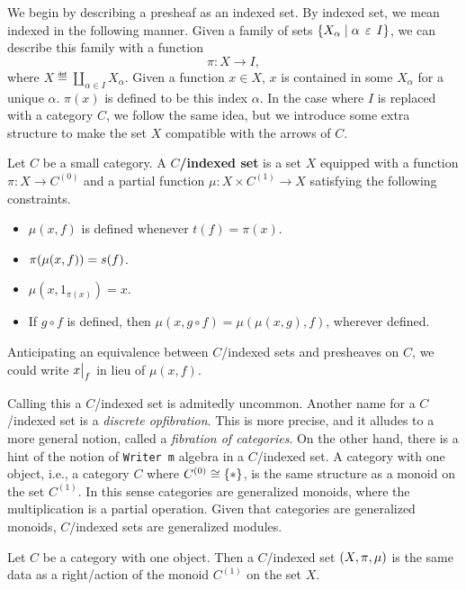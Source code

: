 \documentclass[../main.tex]{subfiles}
\begin{document}
We begin by describing a presheaf as an indexed set. By indexed set, we mean
indexed in the following manner. Given a family of sets \({\left\{ X_\alpha \mid
  \alpha \mathrel{\,\varepsilon\,} I \right\}}\), we can describe this family with a function
\[%
  \pi : X \to I,
\]%
where \(X \eqdef \coprod_{\alpha \in I} X_\alpha\). Given a function \(x \in
X\), \(x\) is contained in some \(X_\alpha\) for a unique \(\alpha\). \(\pi(x)\)
is defined to be this index \(\alpha\). In the case where \(I\) is replaced with
a category \(C\), we follow the same idea, but we introduce some extra structure
to make the set \(X\) compatible with the arrows of \(C\).
\begin{definition}
  Let \(C\) be a small category. A \textbf{\(C\)\-/indexed set} is a set \(X\)
  equipped with a function \(\pi : X \to C^{(0)}\) and a partial function
  \(\mu : X \times C^{(1)} \to X\) satisfying the following constraints.
  \begin{itemize}
  \item \(\mu(x,f)\) is defined whenever \(t(f) = \pi(x)\).
  \item \(\pi{\left(\mu(x,f)\right)} = s(f)\).
  \item \(\mu(x,1_{\pi(x)}) = x\).
  \item If \(g \circ f\) is defined, then \(\mu(x,g\circ f) =
    \mu(\mu(x,g),f)\), wherever defined.
  \end{itemize}
  Anticipating an equivalence between \(C\)\-/indexed sets and presheaves on
  \(C\), we could write \(\restr{x}{f}\) in lieu of \(\mu(x,f)\).
\end{definition}
Calling this a \(C\)\-/indexed set is admitedly uncommon. Another name for a
\(C\)\-/indexed set is a \emph{discrete opfibration}. This is more precise, and
it alludes to a more general notion, called a \emph{fibration of categories}. On
the other hand, there is a hint of the notion of \texttt{Writer m} algebra in a
\(C\)\-/indexed set. A category with one object, i.e., a category \(C\) where
\(C^{(0)} \cong {\left\{\ast\right\}}\), is the same structure as a monoid on the set
\(C^{(1)}\). In this sense categories are generalized monoids, where the
multiplication is a partial operation. Given that categories are generalized
monoids, \(C\)\-/indexed sets are generalized modules.
\begin{proposition}
  Let \(C\) be a category with one object. Then a \(C\)\-/indexed set
  \({\left(X,\pi,\mu\right)}\) is the same data as a right\-/action of the monoid
  \(C^{(1)}\) on the set \(X\).
\end{proposition}
\end{document}
